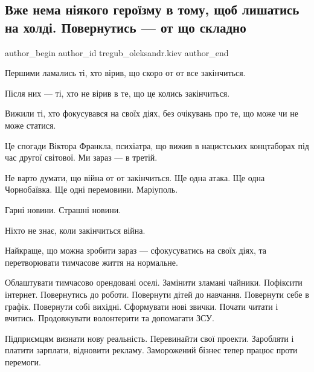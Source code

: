  
 
 
 
 
 
\subsection{Вже нема ніякого героїзму в тому, щоб лишатись на холді. Повернутись — от що складно}
\label{sec:29_03_2022.fb.tregub_oleksandr.kiev.1.geroizm_on_hold}
 
\ifcmt
 author_begin
   author_id tregub_oleksandr.kiev
 author_end
\fi

Першими ламались ті, хто вірив, що скоро от от все закінчиться. 

Після них — ті, хто не вірив в те, що це колись закінчиться.

Вижили ті, хто фокусувався на своїх діях, без очікувань про те, що може чи не
може статися.


Це спогади Віктора Франкла, психіатра, що вижив в нацистських концтаборах під
час другої світової. Ми зараз — в третій. 

Не варто думати, що війна от от закінчиться. Ще одна атака. Ще одна
Чорнобаївка. Ще одні перемовини. Маріуполь.

Гарні новини. Страшні новини.

Ніхто не знає, коли закінчиться війна.

Найкраще, що можна зробити зараз — сфокусуватись на своїх діях, та
перетворювати тимчасове життя на нормальне.

Облаштувати тимчасово орендовані оселі. Замінити зламані чайники. Пофіксити
інтернет. Повернутись до роботи. Повернути дітей до навчання. Повернути себе в
графік. Повернути собі вихідні. Сформувати нові звички. Почати читати і
вчитись. Продовжувати волонтерити та допомагати ЗСУ.

Підприємцям визнати нову реальність. Перевинайти свої проекти. Заробляти і
платити зарплати, відновити рекламу. Заморожений бізнес тепер працює проти
перемоги. 

